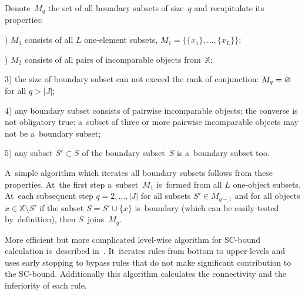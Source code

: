 \documentclass{article}
\let\cite\citep
\def\XX{\mathbb{X}}
\begin{document}
Denote~$M_q$ the set of all boundary subsets of size~$q$
and recapitulate its properties:

) $M_1$ consists of all $L$ one-element subsets, $M_1 = \bigl\{ \{x_1\},\ldots,\{x_L\} \bigr\}$;

) $M_2$ consists of all pairs of incomparable objects from~$\XX$;

3) the size of boundary subset can not exceed the rank of conjunction:
$M_q = \varnothing$ for all $q>|J|$;

4) any boundary subset consists of pairwise incomparable objects;
the converse is not obligatory true:
a~subset of three or more pairwise incomparable objects may not be a~boundary subset;

5) any subset ${S'\subset S}$ of the boundary subset~$S$ is a~boundary subset too.

\medskip
A~simple algorithm which iterates all boundary subsets follows from these properties.
At~the first step
a~subset~$M_1$ is~formed from all $L$ one-object subsets.
At~each subsequent step $q=2,\ldots,|J|$
for all subsets ${S'\in M_{q-1}}$ and for all objects $x \in \XX \setminus S'$
if the subset $S = S'\cup\{x\}$ is~boundary (which can be easily tested by~definition),
then $S$~joins~$M_q$.

More efficient but more complicated level-wise algorithm for SC-bound calculation
is~described in~\cite{voron11premi}.
It~iterates rules from bottom to upper levels
and uses early stopping to bypass rules
that do not make significant contribution to the SC-bound.
Additionally this algorithm calculates the connectivity and the inferiority of each rule.
\end{document}
